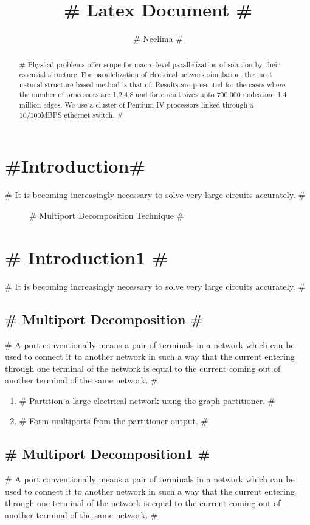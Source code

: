 \documentclass[12pt,a4]{article}
\begin{document}
\title{# Latex Document #}
\author{# Neelima #}
\maketitle

\begin{abstract}
#   Physical problems offer scope for macro level parallelization of solution by their essential structure. 
For parallelization of electrical network simulation, the most natural structure based method is that of. 
Results are presented for the cases where the number of processors are 1,2,4,8 and for circuit sizes upto 700,000 nodes and
1.4 million edges. 
We use a cluster of Pentium IV processors linked through a 10/100MBPS ethernet switch.   #
\end{abstract}

\section{#Introduction#}
#   It is becoming increasingly necessary to solve very large circuits
accurately.    #

\begin{figure}
\caption{# Multiport Decomposition Technique #}
\end{figure}

\section{# Introduction1 #}
#   It is becoming increasingly necessary to solve very large circuits accurately.   #

\subsection{# Multiport Decomposition #}
#   A port conventionally means a pair of terminals in a network which can be used to connect it to another network in such a way 
that the current entering through one terminal of the network is equal to the current coming out of 
another terminal of the same network.   #

\begin{enumerate}
\item #	Partition a large electrical network using the graph partitioner. # 
\item #	Form multiports from the partitioner output. #
\end{enumerate}

\subsection{# Multiport Decomposition1 #}
#   A port conventionally means a pair of terminals in a network which can be used to connect it to another network in such a way 
that the current entering through one terminal of the network is equal to the current coming out of 
another terminal of the same network.   #
\end{document}
